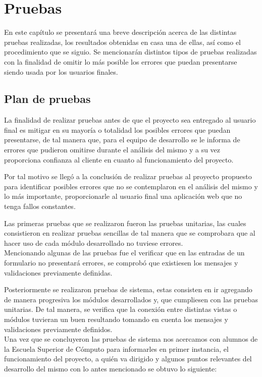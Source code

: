 \chapter{Pruebas}

	\noindent En este capítulo se presentará una breve descripción acerca de las distintas pruebas realizadas, los resultados obtenidas en casa una de ellas, así como el procedimiento que se siguio.
	Se mencionarán distintos tipos de pruebas realizadas con la finalidad de omitir lo más posible los errores que puedan presentarse siendo usada por los usuarios finales. \\
	
	\section{Plan de pruebas}
	\noindent La finalidad de realizar pruebas antes de que el proyecto sea entregado al usuario final es mitigar en su mayoría o totalidad los posibles errores que puedan presentarse, de tal manera que, para el equipo de desarrollo se le informa de errores que pudieron omitirse durante el análisis del mismo y a su vez proporciona confianza al cliente en cuanto al funcionamiento del proyecto.
	
	\noindent Por tal motivo se llegó a la conclusión de realizar pruebas al proyecto propuesto para identificar posibles errores que no se contemplaron en el análisis del mismo y lo más importante, proporcionarle al usuario final una aplicación web que no tenga fallos constantes. 
	
	\noindent Las primeras pruebas que se realizaron fueron las pruebas unitarias, las cuales consistieron en realizar pruebas sencillas de tal manera que se comprobara que al hacer uso de cada módulo desarrollado no tuviese errores.\\
	Mencionando algunas de las pruebas fue el verificar que en las entradas de un formulario no presentará errores, se comprobó que existiesen los mensajes y validaciones previamente definidas.
	
	\noindent Posteriormente se realizaron pruebas de sistema, estas consisten en ir agregando de manera progresiva los módulos desarrollados y, que cumpliesen con las pruebas unitarias. De tal manera, se verifica que la conexión entre distintas vistas o módulos tuvieran un buen resultando tomando en cuenta los mensajes y validaciones previamente definidos. \\
	
	\noindent Una vez que se concluyeron las pruebas de sistema nos acercamos con alumnos de la Escuela Superior de Cómputo para informarles en primer instancia, el funcionamiento del proyecto, a quién va dirigido y algunos puntos relevantes del desarrollo del mismo con lo antes mencionado se obtuvo lo siguiente:
	
